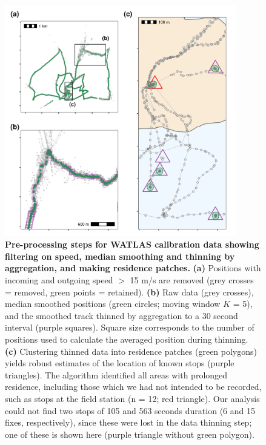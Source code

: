 \begin{figure}[ht!]
    \centering
    \includegraphics[width=0.9\textwidth]{figures/preprocessing/fig_07.png}
    \caption{
        \textbf{Pre-processing steps for WATLAS calibration data showing filtering on speed, median smoothing and thinning by aggregation, and making residence patches.}
        \textbf{(a)} Positions with incoming and outgoing speed $>$ 15 m/s are removed (grey crosses = removed, green points = retained).
        \textbf{(b)} Raw data (grey crosses), median smoothed positions (green circles; moving window $K$ = 5), and the smoothed track thinned by aggregation to a 30 second interval (purple squares).
        Square size corresponds to the number of positions used to calculate the averaged position during thinning.
        \textbf{(c)} Clustering thinned data into residence patches (green polygons) yields robust estimates of the location of known stops (purple triangles).
        The algorithm identified all areas with prolonged residence, including those which we had not intended to be recorded, such as stops at the field station (n = 12; red triangle).
        Our analysis could not find two stops of 105 and 563 seconds duration (6 and 15 fixes, respectively), since these were lost in the data thinning step; one of these is shown here (purple triangle without green polygon).
    }
    \label{preproc_fig_07}
\end{figure}

